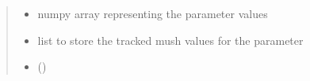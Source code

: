 \documentclass[a4paper,11pt,english,openany]{sphinxmanual}
\begin{document}
\begin{fulllineitems}
\begin{fulllineitems}
\begin{quote}
\begin{description}
\begin{itemize}
\item {} 
\sphinxAtStartPar
{} \textendash{} numpy array representing the parameter values

\item {} 
\sphinxAtStartPar
{} \textendash{} list to store the tracked mush values for the parameter

\item {} 
\sphinxAtStartPar
{} ()

\end{itemize}

\end{description}\end{quote}

\end{fulllineitems}


\end{fulllineitems}

\end{document}
